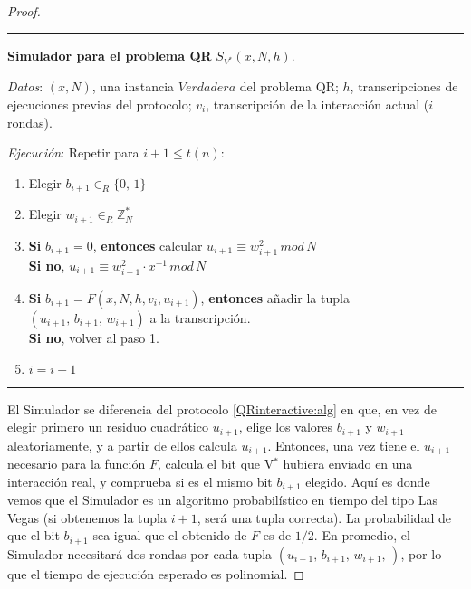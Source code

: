 \begin{proof}
	\hfil 
	
	\rule{\textwidth}{1pt}
	
	\textbf{Simulador para el problema QR} $S_{V^*}(x,N,h)$.
	
	\hfil
	
	\textit{Datos}: \quad $(x,N)$, una instancia $Verdadera$ del problema QR; \quad $h$, transcripciones de ejecuciones previas del protocolo; \quad $v_i$, transcripción de la interacción actual ($i$ rondas).
	
	\textit{Ejecución}: Repetir para $i+1 \leq t(n)$:
	
	\begin{enumerate}
		\item Elegir $b_{i+1} \in_R \{0,\,1\}$
		
		\item Elegir $w_{i+1} \in_R \mathbb{Z}^*_N$
		
		\item \textbf{Si} $b_{i+1} = 0$, \textbf{entonces} calcular \qquad $u_{i+1} \equiv w_{i+1}^2 \, mod \,  N$ \\
			  \textbf{Si no}, \qquad \qquad \qquad \qquad \qquad \qquad \: $u_{i+1} \equiv w_{i+1}^2 \cdot x^{-1} \, mod \,  N$
			  
		\item \textbf{Si} $b_{i+1} = F(x,N,h,v_i,u_{i+1})$, \textbf{entonces} añadir la tupla \\ $(u_{i+1},\,b_{i+1},\,w_{i+1})$ a la transcripción. \\
			  \textbf{Si no}, volver al paso 1.
		
		\item $i = i+1$
		
	\end{enumerate}
	
	\rule{\textwidth}{1pt}
	
	\hfill
	
	El Simulador se diferencia del protocolo \ref{QRinteractive:alg} en que, en vez de elegir primero un residuo cuadrático $u_{i+1}$, elige los valores $b_{i+1}$ y $w_{i+1}$ aleatoriamente, y a partir de ellos calcula $u_{i+1}$. Entonces, una vez tiene el $u_{i+1}$ necesario para la función $F$, calcula el bit que V$^*$ hubiera enviado en una interacción real, y comprueba si es el mismo bit $b_{i+1}$ elegido. Aquí es donde vemos que el Simulador es un algoritmo probabilístico en tiempo del tipo Las Vegas (si obtenemos la tupla $i+1$, será una tupla correcta). La probabilidad de que el bit $b_{i+1}$ sea igual que el obtenido de $F$ es de $1/2$. En promedio, el Simulador necesitará dos rondas por cada tupla $(u_{i+1},\,b_{i+1},\,w_{i+1},\,)$, por lo que el tiempo de ejecución esperado es polinomial. 
	

\end{proof}
